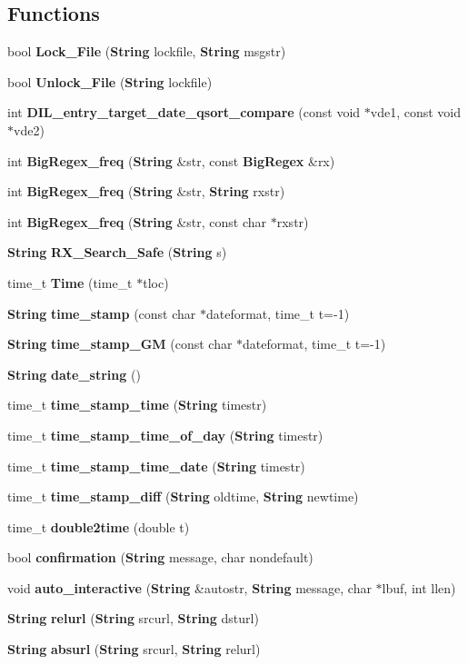 \subsection*{Functions}
\begin{CompactItemize}
\item 
bool {\bf Lock\_\-File} ({\bf String} lockfile, {\bf String} msgstr)
\item 
bool {\bf Unlock\_\-File} ({\bf String} lockfile)
\item 
int {\bf DIL\_\-entry\_\-target\_\-date\_\-qsort\_\-compare} (const void $\ast$vde1, const void $\ast$vde2)
\item 
int {\bf Big\-Regex\_\-freq} ({\bf String} \&str, const {\bf Big\-Regex} \&rx)
\item 
int {\bf Big\-Regex\_\-freq} ({\bf String} \&str, {\bf String} rxstr)
\item 
int {\bf Big\-Regex\_\-freq} ({\bf String} \&str, const char $\ast$rxstr)
\item 
{\bf String} {\bf RX\_\-Search\_\-Safe} ({\bf String} s)
\item 
time\_\-t {\bf Time} (time\_\-t $\ast$tloc)
\item 
{\bf String} {\bf time\_\-stamp} (const char $\ast$dateformat, time\_\-t t=-1)
\item 
{\bf String} {\bf time\_\-stamp\_\-GM} (const char $\ast$dateformat, time\_\-t t=-1)
\item 
{\bf String} {\bf date\_\-string} ()
\item 
time\_\-t {\bf time\_\-stamp\_\-time} ({\bf String} timestr)
\item 
time\_\-t {\bf time\_\-stamp\_\-time\_\-of\_\-day} ({\bf String} timestr)
\item 
time\_\-t {\bf time\_\-stamp\_\-time\_\-date} ({\bf String} timestr)
\item 
time\_\-t {\bf time\_\-stamp\_\-diff} ({\bf String} oldtime, {\bf String} newtime)
\item 
time\_\-t {\bf double2time} (double t)
\item 
bool {\bf confirmation} ({\bf String} message, char nondefault)
\item 
void {\bf auto\_\-interactive} ({\bf String} \&autostr, {\bf String} message, char $\ast$lbuf, int llen)
\item 
{\bf String} {\bf relurl} ({\bf String} srcurl, {\bf String} dsturl)
\item 
{\bf String} {\bf absurl} ({\bf String} srcurl, {\bf String} relurl)
\item 

\end{CompactItemize}
